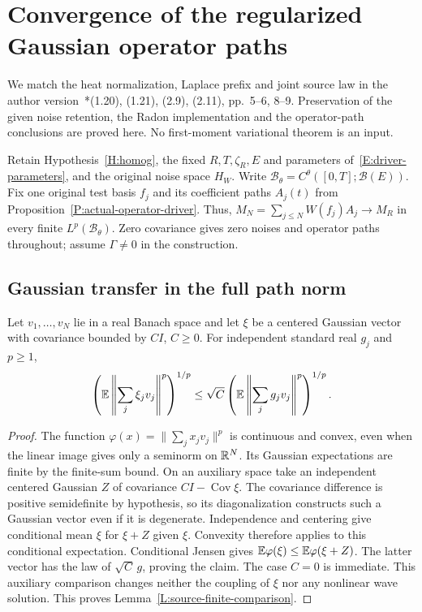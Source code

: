 \section{Convergence of the regularized Gaussian operator paths}
\label{S:source-driver-convergence}

We match the heat normalization, Laplace prefix and joint source law in the
author version~\cite{chen:author2026:time-dependency}*{(1.20), (1.21), (2.9),
(2.11), pp.~5--6, 8--9}. Preservation of the given noise retention, the Radon
implementation and the operator-path conclusions are proved here. No
first-moment variational theorem is an input.

Retain Hypothesis~\ref{H:homog}, the fixed $R,T,\zeta_R,E$ and parameters
of~\eqref{E:driver-parameters}, and the original noise space $H_W$. Write
$\mathscr{B}_\theta = C^\theta([0,T];\mathcal{B}(E))$. Fix one original test
basis $f_j$ and its coefficient paths $A_j(t)$ from
Proposition~\ref{P:actual-operator-driver}. Thus, $M_N = \sum_{j\le N}W(f_j)A_j
\to M_R$ in every finite $L^p(\mathscr{B}_\theta)$. Zero covariance gives zero
noises and operator paths throughout; assume $\Gamma \ne 0$ in the construction.

\subsection{Gaussian transfer in the full path norm}

\begin{lemma}\label{L:source-finite-comparison}
  Let $v_1,\ldots,v_N$ lie in a real Banach space and let $\xi$ be a centered
  Gaussian vector with covariance bounded by $CI$, $C \ge 0$. For independent
  standard real $g_j$ and $p \ge 1$,
  \begin{equation}\label{E:source-finite-comparison}
    \left(\mathbb{E}\left\|\sum_j\xi_jv_j\right\|^p\right)^{1/p}
    \le\sqrt C\left(\mathbb{E}\left\|\sum_jg_jv_j\right\|^p\right)^{1/p}.
  \end{equation}
\end{lemma}

\begin{proof}
  The function $\varphi(x) = \|\sum_jx_jv_j\|^p$ is continuous and convex, even
  when the linear image gives only a seminorm on $\mathbb{R}^N$. Its Gaussian
  expectations are finite by the finite-sum bound. On an auxiliary space take an
  independent centered Gaussian $Z$ of covariance $CI-\operatorname{Cov}\xi$.
  The covariance difference is positive semidefinite by hypothesis, so its
  diagonalization constructs such a Gaussian vector even if it is degenerate.
  Independence and centering give conditional mean $\xi$ for $\xi+Z$ given
  $\xi$. Convexity therefore applies to this conditional expectation.
  Conditional Jensen gives $\mathbb{E}\varphi(\xi) \le \mathbb{E}\varphi(\xi+Z)$. The latter
  vector has the law of $\sqrt C\,g$, proving the claim. The case $C = 0$ is
  immediate. This auxiliary comparison changes neither the coupling of $\xi$ nor
  any nonlinear wave solution. This proves
  Lemma~\ref{L:source-finite-comparison}.
\end{proof}

